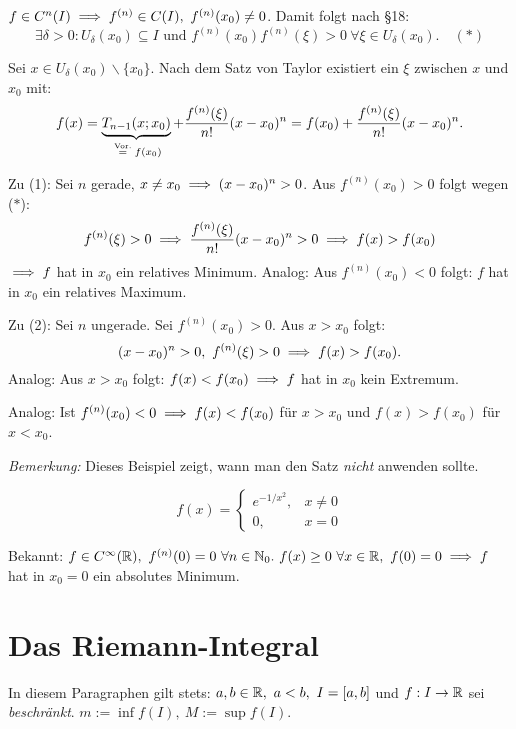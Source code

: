 \documentclass[a4paper,twoside,DIV15,BCOR12mm]{scrbook}
\begin{document}
\begin{beweis}
$f \in C^n(I) \folgt f^{(n)} \in C(I),\ f^{(n)}(x_0) \ne 0$. Damit folgt nach §18:
$$\exists \delta > 0: U_\delta(x_0) \subseteq I\text{ und }f^{(n)}(x_0) f^{(n)}(\xi) > 0\ \forall \xi \in U_\delta(x_0).\quad(*)$$

Sei $x\in U_\delta(x_0)\backslash \{x_0\}$. Nach dem Satz von Taylor existiert ein $\xi$ zwischen $x$ und $x_0$ mit:
$$f(x) = \underbrace{T_{n-1}(x;x_0)}_{\gleichnach{Vor.} f(x_0)} + \frac{f^{(n)}(\xi)}{n!}(x-x_0)^n = f(x_0) + \frac{f^{(n)}(\xi)}{n!}(x-x_0)^n.$$

Zu (1): Sei $n$ gerade, $x \ne x_0 \implies (x-x_0)^n > 0$. Aus $f^{(n)}(x_0) > 0$ folgt wegen ($*$):
$$f^{(n)}(\xi) > 0 \implies \frac{f^{(n)}(\xi)}{n!}(x-x_0)^n > 0 \implies f(x) > f(x_0)$$
$\implies f$ hat in $x_0$ ein relatives Minimum. Analog: Aus $f^{(n)}(x_0) < 0$ folgt: $f$ hat in $x_0$ ein relatives Maximum.

Zu (2): Sei $n$ ungerade. Sei $f^{(n)}(x_0) > 0$. Aus $x > x_0$ folgt:
$$(x-x_0)^n > 0,\ f^{(n)}(\xi) > 0 \implies f(x) > f(x_0).$$
Analog: Aus $x > x_0$ folgt: $f(x) < f(x_0) \implies f$ hat in $x_0$ kein Extremum.

Analog: Ist $f^{(n)}(x_0) < 0 \implies f(x) < f(x_0)$ für $x > x_0$ und $f(x) > f(x_0)$ für $x < x_0$.
\end{beweis}

\begin{beispiel}
\emph{Bemerkung:} Dieses Beispiel zeigt, wann man den Satz \emph{nicht} anwenden sollte.

$$f(x) = \begin{cases}
e^{-1/x^2},& x \ne 0\\
0,& x=0
\end{cases}$$

Bekannt: $f \in C^\infty(\mathbb{R}),\ f^{(n)}(0) = 0\ \forall n \in \mathbb{N}_0.\ f(x) \ge 0\ \forall x \in \mathbb{R},\ f(0) = 0 \implies f$ hat in $x_0 = 0$ ein absolutes Minimum.
\end{beispiel}


\theoremstyle{nonumberbreak}
\newtheorem{merkregel}{Merkregel}

\chapter{Das Riemann-Integral}

In diesem Paragraphen gilt stets: $a,b \in \mathbb{R},\ a<b,\ I = [a,b]$ und $f: I \to \mathbb{R}$ sei \emph{beschränkt}. $m := \inf f(I),\ M := \sup f(I)$.
\end{document}
